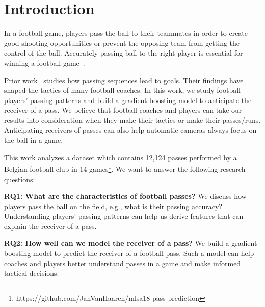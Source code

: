 \section{Introduction} \label{intro}
In a football game, players pass the ball to their teammates in order to create good shooting opportunities or prevent the opposing team from getting the control of the ball.
Accurately passing ball to the right player is essential for winning a football game~\cite{Ali2011Measuring,Hughes2005Analysis}.

Prior work~\cite{reep1968skill,Hughes2005Analysis} studies how passing sequences lead to goals. Their findings have shaped the tactics of many football coaches.
In this work, we study football players' passing patterns and build a gradient boosting model to anticipate the receiver of a pass.
We believe that football coaches and players can take our results into consideration when they make their tactics or make their passes/runs. 
Anticipating receivers of passes can also help automatic cameras always focus on the ball in a game.

This work analyzes a dataset which contains 12,124 passes performed by a Belgian football club in 14 games\footnote{\label{origin_dataset}https://github.com/JanVanHaaren/mlsa18-pass-prediction}. We want to answer the following research questions: 

\begin{description}
	\item \textbf{RQ1: What are the characteristics of football passes?}
	We discuss how players pass the ball on the field, e.g., what is their passing accuracy? %
	Understanding players' passing patterns can help us derive features that can explain the receiver of a pass. 
	
	\item \textbf{RQ2: How well can we model the receiver of a pass?}
	We build a gradient boosting model to predict the receiver of a football pass. 
	Such a model can help coaches and players better understand passes in a game and make informed tactical decisions.
	
\end{description}

